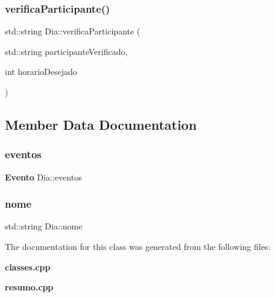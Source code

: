 \mbox{\label{class_dia_a89bd31c85f36ad37eaba9e5712494ac8}} 
\subsubsection{verifica\+Participante()}
{\footnotesize\ttfamily std\+::string Dia\+::verifica\+Participante (\begin{DoxyParamCaption}\item[{std\+::string}]{participante\+Verificado,  }\item[{int}]{horario\+Desejado }\end{DoxyParamCaption})\hspace{0.3cm}{\ttfamily [inline]}}



\subsection{Member Data Documentation}
\mbox{\label{class_dia_a7a1db59cab100eb7404553f6e391efd4}} 
\subsubsection{eventos}
{\footnotesize\ttfamily \textbf{ Evento} Dia\+::eventos}

\mbox{\label{class_dia_a637e54ca45f352ec7f042029fb420c43}} 
\subsubsection{nome}
{\footnotesize\ttfamily std\+::string Dia\+::nome}



The documentation for this class was generated from the following files\+:\begin{DoxyCompactItemize}
\item 
\textbf{ classes.\+cpp}\item 
\textbf{ resumo.\+cpp}\end{DoxyCompactItemize}
